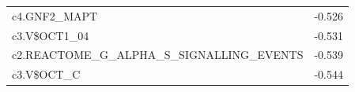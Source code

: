 \begin{table}[!htbp]
\begin{tabular}{@{}ll@{}}
c4.GNF2\_MAPT                                                                                                                                                                                                                           & -0.526         \\
c3.V\$OCT1\_04                                                                                                                                                                                                                          & -0.531         \\
c2.REACTOME\_G\_ALPHA\_S\_SIGNALLING\_EVENTS                                                                                                                                                                                            & -0.539         \\
c3.V\$OCT\_C                                                                                                                                                                                                                            & -0.544         \\ \bottomrule
\end{tabular}
\end{table}

